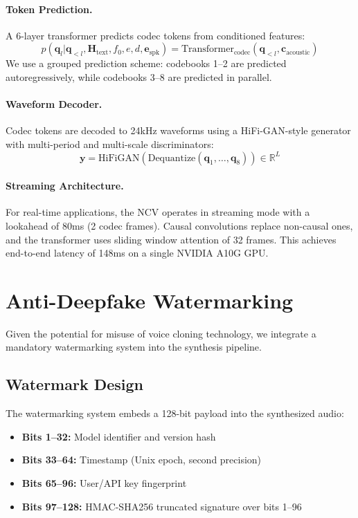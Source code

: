 \documentclass[11pt,a4paper]{article}
\begin{document}
\paragraph{Token Prediction.} A 6-layer transformer predicts codec tokens from conditioned features:
\begin{equation}
    p(\bm{q}_l | \bm{q}_{<l}, \bm{H}_{\text{text}}, f_0, e, d, \bm{e}_{\text{spk}}) = \text{Transformer}_{\text{codec}}(\bm{q}_{<l}, \bm{c}_{\text{acoustic}})
\end{equation}
We use a grouped prediction scheme: codebooks 1--2 are predicted autoregressively, while codebooks 3--8 are predicted in parallel.

\paragraph{Waveform Decoder.} Codec tokens are decoded to 24kHz waveforms using a HiFi-GAN-style generator \citep{kong2020hifi} with multi-period and multi-scale discriminators:
\begin{equation}
    \bm{y} = \text{HiFiGAN}(\text{Dequantize}(\bm{q}_1, \ldots, \bm{q}_8)) \in \mathbb{R}^{L}
\end{equation}

\paragraph{Streaming Architecture.} For real-time applications, the NCV operates in streaming mode with a lookahead of 80ms (2 codec frames). Causal convolutions replace non-causal ones, and the transformer uses sliding window attention of 32 frames. This achieves end-to-end latency of 148ms on a single NVIDIA A10G GPU.

\section{Anti-Deepfake Watermarking}
\label{sec:watermark}

Given the potential for misuse of voice cloning technology, we integrate a mandatory watermarking system into the synthesis pipeline.

\subsection{Watermark Design}

The watermarking system embeds a 128-bit payload into the synthesized audio:
\begin{itemize}
    \item \textbf{Bits 1--32:} Model identifier and version hash
    \item \textbf{Bits 33--64:} Timestamp (Unix epoch, second precision)
    \item \textbf{Bits 65--96:} User/API key fingerprint
    \item \textbf{Bits 97--128:} HMAC-SHA256 truncated signature over bits 1--96
\end{itemize}
\end{document}
